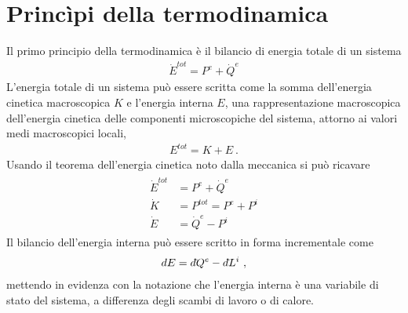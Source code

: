 \documentclass[letterpaper,10pt,english]{jupyterBook}
\begin{document}
\chapter{Princìpi della termodinamica}
\label{\detokenize{ch/principles:principi-della-termodinamica}}\label{\detokenize{ch/principles:classical-thermodynamics-principles}}\label{\detokenize{ch/principles::doc}}
\sphinxAtStartPar
{} Il primo principio della termodinamica è il bilancio di energia totale di un sistema
\begin{equation*}
\begin{split}\dot{E}^{tot} = P^{e} + \dot{Q}^{e}\end{split}
\end{equation*}
\sphinxAtStartPar
L’energia totale di un sistema può essere scritta come la somma dell’energia cinetica macroscopica \(K\) e l’energia interna \(E\), una rappresentazione macroscopica dell’energia cinetica delle componenti microscopiche del sistema, attorno ai valori medi macroscopici locali,
\begin{equation*}
\begin{split}E^{tot} = K + E \ .\end{split}
\end{equation*}
\sphinxAtStartPar
Usando il teorema dell’energia cinetica  \sphinxstylestrong{{[}REF{]}} noto dalla meccanica si può ricavare
\begin{equation*}
\begin{split}\begin{aligned}
  \dot{E}^{tot} & = P^{e} + \dot{Q}^e \\
  \dot{K}       & = P^{tot} = P^{e} + P^{i} \\
  \dot{E}       & = \dot{Q}^e - P^{i} 
\end{aligned}\end{split}
\end{equation*}
\sphinxAtStartPar
Il bilancio dell’energia interna può essere scritto in forma incrementale come
\begin{equation*}
\begin{split}d E = d\hspace{-0.08pt}\bar{}\hspace{0.1pt} Q^e - d\hspace{-0.08pt}\bar{}\hspace{0.1pt} L^i \ ,\end{split}
\end{equation*}
\sphinxAtStartPar
mettendo in evidenza con la notazione che l’energia interna è una variabile di stato del sistema, a differenza degli scambi di lavoro o di calore.
\end{document}
